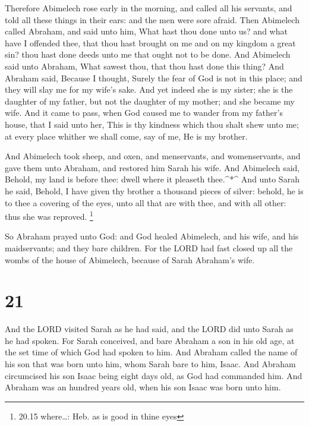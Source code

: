  Therefore Abimelech rose early in the morning, and called
all his servants, and told all these things in their ears: and the men
were sore afraid.  Then Abimelech called Abraham, and said
unto him, What hast thou done unto us? and what have I offended thee,
that thou hast brought on me and on my kingdom a great sin? thou hast
done deeds unto me that ought not to be done.  And
Abimelech said unto Abraham, What sawest thou, that thou hast done this
thing?  And Abraham said, Because I thought, Surely the
fear of God is not in this place; and they will slay me for my wife's
sake.  And yet indeed she is my sister; she is the daughter
of my father, but not the daughter of my mother; and she became my wife.
 And it came to pass, when God caused me to wander from my
father's house, that I said unto her, This is thy kindness which thou
shalt shew unto me; at every place whither we shall come, say of me, He
is my brother.

 And Abimelech took sheep, and oxen, and menservants, and
womenservants, and gave them unto Abraham, and restored him Sarah his
wife.  And Abimelech said, Behold, my land is before thee:
dwell where it pleaseth thee.\^{}*\^{}  And unto Sarah he
said, Behold, I have given thy brother a thousand pieces of silver:
behold, he is to thee a covering of the eyes, unto all that are with
thee, and with all other: thus she was reproved. \footnote{20.15
  where\ldots: Heb. as is good in thine eyes}

 So Abraham prayed unto God: and God healed Abimelech, and
his wife, and his maidservants; and they bare children. 
For the LORD had fast closed up all the wombs of the house of Abimelech,
because of Sarah Abraham's wife.

\hypertarget{section-20}{%
\section{21}\label{section-20}}

 And the LORD visited Sarah as he had said, and the LORD did
unto Sarah as he had spoken.  For Sarah conceived, and bare
Abraham a son in his old age, at the set time of which God had spoken to
him.  And Abraham called the name of his son that was born
unto him, whom Sarah bare to him, Isaac.  And Abraham
circumcised his son Isaac being eight days old, as God had commanded
him.  And Abraham was an hundred years old, when his son
Isaac was born unto him.

